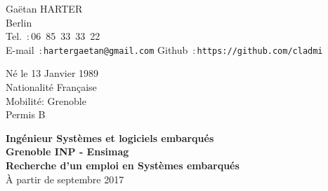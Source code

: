 \documentclass{cv}
\begin{document}
\begin{chapeau}
\hspace{1cm}
\begin{adresse}
        Gaëtan HARTER\\
        Berlin \\
        \vspace{3pt}
        Tel.~:\,06~85~33~33~22\\
        E-mail~:\,\texttt{hartergaetan@gmail.com}
        Github~:\,\texttt{https://github.com/cladmi}
\end{adresse}
\begin{etatcivil}
        Né le 13 Janvier 1989\\
        Nationalité Française\\
        Mobilité: Grenoble\\
        Permis B
\end{etatcivil}
\hspace{0.5cm}
\end{chapeau}
\vspace{0.5cm}
\begin{center}
        \textbf{\Large Ingénieur Systèmes et logiciels embarqués\\}
        \textbf{\large Grenoble INP - Ensimag\\}
        \vspace{0.5em}
        \textbf{\large Recherche d'un emploi en Systèmes embarqués\\} %
        {À partir de septembre 2017}
\end{center}



\end{document}
